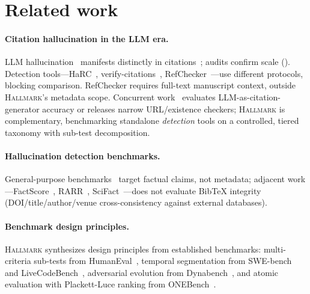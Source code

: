 \section{Related work}
\label{sec:related}

\paragraph{Citation hallucination in the LLM era.}
LLM hallucination~\citep{ji2023survey,huang2023survey} manifests distinctly in citations~\citep{alkaissi2023,agrawal2024}; audits confirm scale (\citet{ghostcite2026,hallucitation2026,mysterious2026}).
Detection tools---HaRC~\citep{harc2024}, verify-citations~\citep{verifycitations2025}, RefChecker~\citep{refchecker2024}---use different protocols, blocking comparison. RefChecker requires full-text manuscript context, outside \textsc{Hallmark}'s metadata scope.
Concurrent work~\citep{rao2026bibtex,raowong2026urls,checkifexist2026,hallucitechecker2026} evaluates LLM-as-citation-generator accuracy or releases narrow URL/existence checkers; \textsc{Hallmark} is complementary, benchmarking standalone \emph{detection} tools on a controlled, tiered taxonomy with sub-test decomposition.

\paragraph{Hallucination detection benchmarks.}
General-purpose benchmarks~\citep{hallueval2023,halogen2024} target factual claims, not metadata; adjacent work---FactScore~\citep{min2023factscore}, RARR~\citep{gao2023rarr}, SciFact~\citep{wadden2020scifact}---does not evaluate BibTeX integrity (DOI/title/author/venue cross-consistency against external databases).

\paragraph{Benchmark design principles.}
\textsc{Hallmark} synthesizes design principles from established benchmarks: multi-criteria sub-tests from HumanEval~\citep{humaneval}, temporal segmentation from SWE-bench~\citep{swebench} and LiveCodeBench~\citep{livecodebench2024}, adversarial evolution from Dynabench~\citep{kiela2021dynabench}, and atomic evaluation with Plackett-Luce ranking from ONEBench~\citep{onebench2024}.
